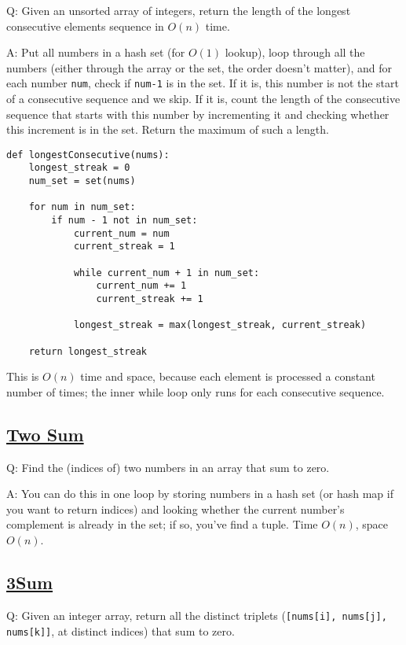 \documentclass[8pt, table, xcdraw]{article}%
\begin{document}
Q: Given an unsorted array of integers, return the length of the longest consecutive elements sequence in $O(n)$ time.

A: Put all numbers in a hash set (for $O(1)$ lookup), loop through all the numbers (either through the array or the set, the order doesn't matter), and for each number \lstinline{num}, check if \lstinline{num-1} is in the set. If it is, this number is not the start of a consecutive sequence and we skip. If it is, count the length of the consecutive sequence that starts with this number by incrementing it and checking whether this increment is in the set. Return the maximum of such a length.

\begin{lstlisting}
def longestConsecutive(nums):
    longest_streak = 0
    num_set = set(nums)

    for num in num_set:
        if num - 1 not in num_set:
            current_num = num
            current_streak = 1

            while current_num + 1 in num_set:
                current_num += 1
                current_streak += 1

            longest_streak = max(longest_streak, current_streak)

    return longest_streak
\end{lstlisting}

This is $O(n)$ time and space, because each element is processed a constant number of times; the inner while loop only runs for each consecutive sequence.

\subsection{\href{https://leetcode.com/problems/two-sum}{Two Sum}}

Q: Find the (indices of) two numbers in an array that sum to zero.

A: You can do this in one loop by storing numbers in a hash set (or hash map if you want to return indices) and looking whether the current number's complement is already in the set; if so, you've find a tuple. Time $O(n)$, space $O(n)$.

\subsection{\href{https://leetcode.com/problems/3sum}{3Sum}}

Q: Given an integer array, return all the distinct triplets (\lstinline{[nums[i], nums[j], nums[k]]}, at distinct indices) that sum to zero.
\end{document}

